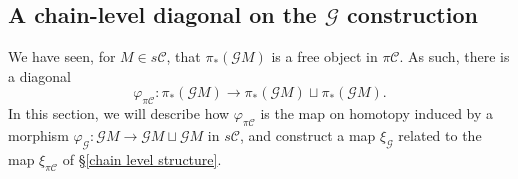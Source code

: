 \documentclass[11pt]{amsart} \renewcommand{\baselinestretch}{1.2}
\theoremstyle{plain}
\theoremstyle{definition}
\let\phi\varphi
\renewcommand{\to}{\longrightarrow}
\newcommand{\scrG}{\mathscr{G}}
\newcommand{\calc}{\mathcal{C}}
\newcommand{\BSW}{{\scrG}}
\newcommand{\PA}[1]{\pi#1}
\begin{document}
\begin{Composite functor spectral sequences}
\subsection{A chain-level diagonal on the $\BSW $ construction}
\label{Subsection: Chain level diagonal}
We have seen, for $M\in s\calc$, that $\pi_*(\BSW M)$ is a free object in $\PA{\calc}$. As such, there is a diagonal
\[\phi_{\PA{\calc}}:\pi_*(\BSW M)\to \pi_*(\BSW M)\sqcup \pi_*(\BSW M).\]
In this section, we will describe how $\phi_{\PA{\calc}}$ is the map on homotopy induced by a morphism $\phi_\BSW :\BSW M\to \BSW M\sqcup \BSW M$ in $s\calc$, and construct a map $\xi_{\BSW}$ related to the map $\xi_{\PA{\calc}}$ of \S\ref{chain level structure}. %


\end{Composite functor spectral sequences}
\end{document}
